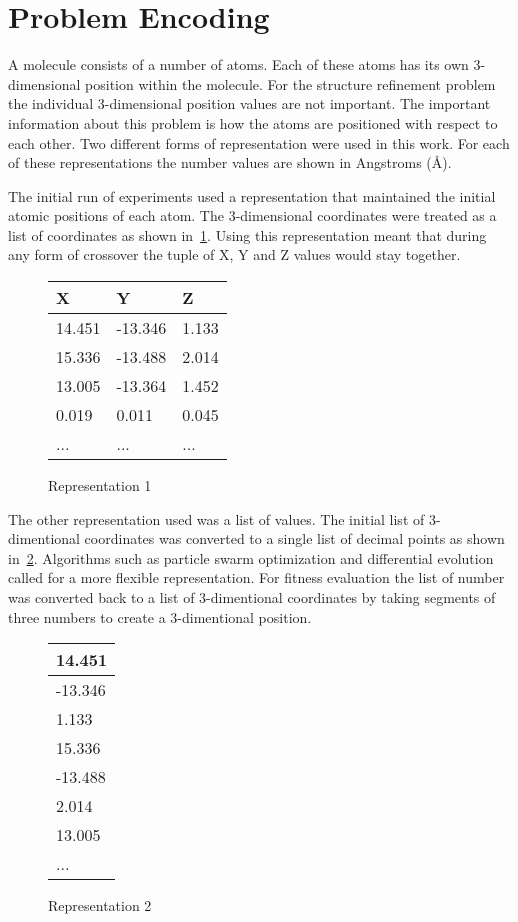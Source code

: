 \section{Problem Encoding}

A molecule consists of a number of atoms. Each of these atoms has its own 3-dimensional position within the molecule. For the structure refinement problem the individual 3-dimensional position values are not important. The important information about this problem is how the atoms are positioned with respect to each other. Two different forms of representation were used in this work. For each of these representations the number values are shown in Angstroms (\AA).

The initial run of experiments used a representation that maintained the initial atomic positions of each atom. The 3-dimensional coordinates were treated as a list of coordinates as shown in~\ref{fig:representation1}. Using this representation meant that during any form of crossover the tuple of X, Y and Z values would stay together.

\begin{figure}
	\centering
	\begin{tabular}{ | l | l | l | }
		\hline
		X & Y & Z \\ \hline
		14.451 & -13.346 & 1.133 \\ \hline
		15.336 & -13.488 & 2.014 \\ \hline
		13.005 & -13.364 & 1.452 \\ \hline
		0.019 & 0.011 & 0.045 \\ \hline
		... & ... & ... \\ \hline
	\end{tabular}
	\caption{Representation 1}
	\label{fig:representation1}
\end{figure}

The other representation used was a list of values. The initial list of 3-dimentional coordinates was converted to a single list of decimal points as shown in~\ref{fig:representation2}. Algorithms such as particle swarm optimization and differential evolution called for a more flexible representation. For fitness evaluation the list of number was converted back to a list of 3-dimentional coordinates by taking segments of three numbers to create a 3-dimentional position.

\begin{figure}
	\centering
	\begin{tabular}{ | l | }
		\hline
		14.451 \\ \hline
		-13.346 \\ \hline
		1.133 \\ \hline
		15.336 \\ \hline
		-13.488 \\ \hline
		2.014 \\ \hline
		13.005 \\ \hline
		... \\ \hline
	\end{tabular}
	\caption{Representation 2}
	\label{fig:representation2}
\end{figure}